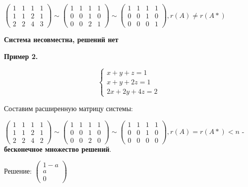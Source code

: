 \documentclass{article}
\begin{document}
\begin{flushleft}
$\begin{pmatrix}
    1 & 1 & 1 & 1 \\
    1 & 1 & 2 & 1 \\
    2 & 2 & 4 & 3
\end{pmatrix} \sim \begin{pmatrix}
    1 & 1 & 1 & 1 \\
    0 & 0 & 1 & 0 \\
    0 & 0 & 2 & 1
\end{pmatrix} \sim \begin{pmatrix}
    1 & 1 & 1 & 1 \\
    0 & 0 & 1 & 0 \\
    0 & 0 & 0 & 1
\end{pmatrix}, r(A) \ne r(A*)$

\hfill 

\textbf{Система несовместна, решений нет}

\hfill

\textbf{Пример 2.}

\begin{equation}
    \begin{cases}
        x + y + z = 1 \\
        x + y + 2z = 1 \\
        2x + 2y + 4z = 2
    \end{cases}
\end{equation}

Составим расширенную матрицу системы:

$\begin{pmatrix}
    1 & 1 & 1 & 1 \\
    1 & 1 & 2 & 1 \\
    2 & 2 & 4 & 2
\end{pmatrix} \sim \begin{pmatrix}
    1 & 1 & 1 & 1 \\
    0 & 0 & 1 & 0 \\
    0 & 0 & 2 & 0
\end{pmatrix} \sim \begin{pmatrix}
    1 & 1 & 1 & 1 \\
    0 & 0 & 1 & 0 \\
    0 & 0 & 0 & 0
\end{pmatrix}, r(A) = r(A*) < n$ - \textbf{бесконечное множество решений}.

Решение: $\begin{pmatrix}
    1 - a \\
    a \\
    0
\end{pmatrix}$


\end{flushleft}
\end{document}
